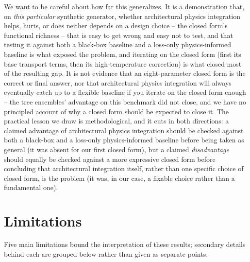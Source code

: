 \documentclass[11pt]{article}
\begin{document}
We want to be careful about how far this generalizes. It is a demonstration that, on \emph{this particular} synthetic generator, whether architectural physics integration helps, hurts, or does neither depends on a design choice -- the closed form's functional richness -- that is easy to get wrong and easy not to test, and that testing it against both a black-box baseline and a loss-only physics-informed baseline is what exposed the problem, and iterating on the closed form (first its base transport terms, then its high-temperature correction) is what closed most of the resulting gap. It is not evidence that an eight-parameter closed form is the correct or final answer, nor that architectural physics integration will always eventually catch up to a flexible baseline if you iterate on the closed form enough -- the tree ensembles' advantage on this benchmark did not close, and we have no principled account of why a closed form should be expected to close it. The practical lesson we draw is methodological, and it cuts in both directions: a claimed advantage of architectural physics integration should be checked against both a black-box and a loss-only physics-informed baseline before being taken as general (it was absent for our first closed form), but a claimed \emph{disadvantage} should equally be checked against a more expressive closed form before concluding that architectural integration itself, rather than one specific choice of closed form, is the problem (it was, in our case, a fixable choice rather than a fundamental one).

\section{Limitations}
\label{sec:limitations}

Five main limitations bound the interpretation of these results; secondary details behind each are grouped below rather than given as separate points.
\end{document}
